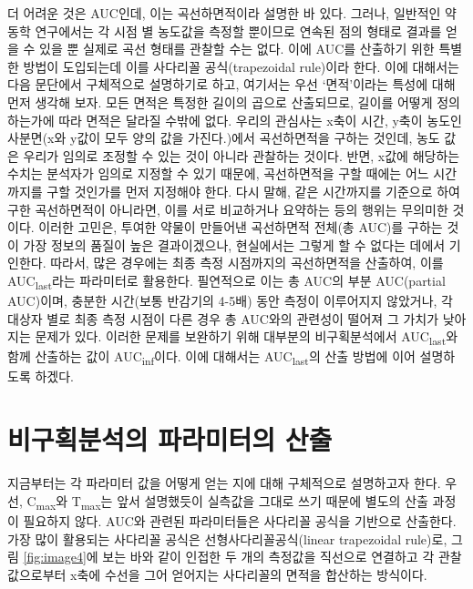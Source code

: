\documentclass[
  11pt,
  krantz2, a4paper, twoside]{krantz}
\theoremstyle{definition}
\theoremstyle{definition}
\theoremstyle{definition}
\theoremstyle{definition}
\theoremstyle{remark}
\begin{document}
더 어려운 것은 AUC인데, 이는 곡선하면적이라 설명한 바 있다.
그러나, 일반적인 약동학 연구에서는 각 시점 별 농도값을 측정할 뿐이므로 연속된 점의 형태로 결과를 얻을 수 있을 뿐 실제로 곡선 형태를 관찰할 수는 없다. 
이에 AUC를 산출하기 위한 특별한 방법이 도입되는데 이를 사다리꼴 공식(trapezoidal rule)이라 한다.
이에 대해서는 다음 문단에서 구체적으로 설명하기로 하고, 여기서는 우선 `면적'이라는 특성에 대해 먼저 생각해 보자.
모든 면적은 특정한 길이의 곱으로 산출되므로, 길이를 어떻게 정의하는가에 따라 면적은 달라질 수밖에 없다.
우리의 관심사는 x축이 시간, y축이 농도인 사분면(x와 y값이 모두 양의 값을 가진다.)에서 곡선하면적을 구하는 것인데, 농도 값은 우리가 임의로 조정할 수 있는 것이 아니라 관찰하는 것이다.
반면, x값에 해당하는 수치는 분석자가 임의로 지정할 수 있기 때문에, 곡선하면적을 구할 때에는 어느 시간까지를 구할 것인가를 먼저 지정해야 한다.
다시 말해, 같은 시간까지를 기준으로 하여 구한 곡선하면적이 아니라면, 이를 서로 비교하거나 요약하는 등의 행위는 무의미한 것이다.
이러한 고민은, 투여한 약물이 만들어낸 곡선하면적 전체(총 AUC)를 구하는 것이 가장 정보의 품질이 높은 결과이겠으나, 현실에서는 그렇게 할 수 없다는 데에서 기인한다.
따라서, 많은 경우에는 최종 측정 시점까지의 곡선하면적을 산출하여, 이를 AUC\textsubscript{last}라는 파라미터로 활용한다.
필연적으로 이는 총 AUC의 부분 AUC(partial AUC)이며, 충분한 시간(보통 반감기의 4-5배) 동안 측정이 이루어지지 않았거나, 각 대상자 별로 최종 측정 시점이 다른 경우 총 AUC와의 관련성이 떨어져 그 가치가 낮아지는 문제가 있다. 
이러한 문제를 보완하기 위해 대부분의 비구획분석에서 AUC\textsubscript{last}와 함께 산출하는 값이 AUC\textsubscript{inf}이다.
이에 대해서는 AUC\textsubscript{last}의 산출 방법에 이어 설명하도록 하겠다.

\section{비구획분석의 파라미터의 산출}\label{uxbe44uxad6cuxd68duxbd84uxc11duxc758-uxd30cuxb77cuxbbf8uxd130uxc758-uxc0b0uxcd9c}

지금부터는 각 파라미터 값을 어떻게 얻는 지에 대해 구체적으로 설명하고자 한다.
우선, C\textsubscript{max}와 T\textsubscript{max}는 앞서 설명했듯이 실측값을 그대로 쓰기 때문에 별도의 산출 과정이 필요하지 않다. AUC와 관련된 파라미터들은 사다리꼴 공식을 기반으로 산출한다. 가장 많이 활용되는 사다리꼴 공식은 선형사다리꼴공식(linear trapezoidal rule)로, 그림 \ref{fig:image4}에 보는 바와 같이 인접한 두 개의 측정값을 직선으로 연결하고 각 관찰값으로부터 x축에 수선을 그어 얻어지는 사다리꼴의 면적을 합산하는 방식이다.
\end{document}
